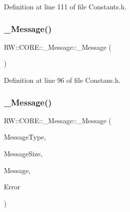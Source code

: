 Definition at line 111 of file Constants.\+h.

\hypertarget{struct_r_w_1_1_c_o_r_e_1_1___message_ac3c261b3da08864054ea50df9e6d32c8}{}\label{struct_r_w_1_1_c_o_r_e_1_1___message_ac3c261b3da08864054ea50df9e6d32c8} 
\subsubsection{\texorpdfstring{\+\_\+\+Message()}{\_Message()}\hspace{0.1cm}{\footnotesize\ttfamily [3/4]}}
{\footnotesize\ttfamily R\+W\+::\+C\+O\+R\+E\+::\+\_\+\+Message\+::\+\_\+\+Message (\begin{DoxyParamCaption}{ }\end{DoxyParamCaption})\hspace{0.3cm}{\ttfamily [inline]}}



Definition at line 96 of file Constans.\+h.

\hypertarget{struct_r_w_1_1_c_o_r_e_1_1___message_a9b99a2dbdd3c75786a2f90bc91707c36}{}\label{struct_r_w_1_1_c_o_r_e_1_1___message_a9b99a2dbdd3c75786a2f90bc91707c36} 
\subsubsection{\texorpdfstring{\+\_\+\+Message()}{\_Message()}\hspace{0.1cm}{\footnotesize\ttfamily [4/4]}}
{\footnotesize\ttfamily R\+W\+::\+C\+O\+R\+E\+::\+\_\+\+Message\+::\+\_\+\+Message (\begin{DoxyParamCaption}\item[{Util\+::\+Functions}]{Message\+Type,  }\item[{quint16}]{Message\+Size,  }\item[{Q\+Byte\+Array}]{Message,  }\item[{Util\+::\+Error\+ID}]{Error }\end{DoxyParamCaption})\hspace{0.3cm}{\ttfamily [inline]}}



